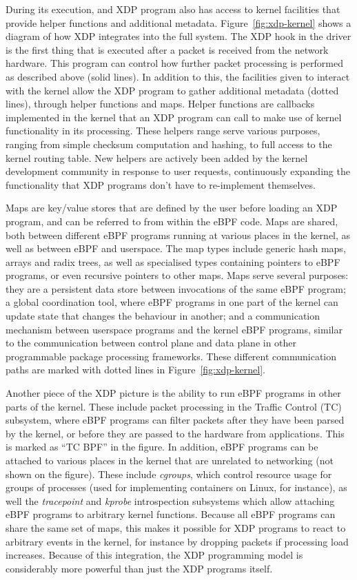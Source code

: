 \documentclass[10pt,sigconf]{acmart}
\begin{document}
During its execution, and XDP program also has access to kernel facilities that
provide helper functions and additional metadata. Figure~\ref{fig:xdp-kernel}
shows a diagram of how XDP integrates into the full system. The XDP hook in the
driver is the first thing that is executed after a packet is received from the
network hardware. This program can control how further packet processing is
performed as described above (solid lines). In addition to this, the facilities
given to interact with the kernel allow the XDP program to gather additional
metadata (dotted lines), through helper functions and maps. Helper functions are
callbacks implemented in the kernel that an XDP program can call to make use of
kernel functionality in its processing. These helpers range serve various
purposes, ranging from simple checksum computation and hashing, to full access
to the kernel routing table. New helpers are actively been added by the kernel
development community in response to user requests, continuously expanding the
functionality that XDP programs don't have to re-implement themselves.

Maps are key/value stores that are defined by the user before loading an XDP
program, and can be referred to from within the eBPF code. Maps are shared, both
between different eBPF programs running at various places in the kernel, as well
as between eBPF and userspace. The map types include generic hash maps, arrays
and radix trees, as well as specialised types containing pointers to eBPF
programs, or even recursive pointers to other maps. Maps serve several purposes:
they are a persistent data store between invocations of the same eBPF program; a
global coordination tool, where eBPF programs in one part of the kernel can
update state that changes the behaviour in another; and a communication
mechanism between userspace programs and the kernel eBPF programs, similar to
the communication between control plane and data plane in other programmable
package processing frameworks. These different communication paths are marked
with dotted lines in Figure~\ref{fig:xdp-kernel}.

Another piece of the XDP picture is the ability to run eBPF programs in other
parts of the kernel. These include packet processing in the Traffic Control (TC)
subsystem, where eBPF programs can filter packets after they have been parsed by
the kernel, or before they are passed to the hardware from applications. This is
marked as ``TC BPF'' in the figure. In addition, eBPF programs can be attached
to various places in the kernel that are unrelated to networking (not shown on
the figure). These include \emph{cgroups}, which control resource usage for
groups of processes (used for implementing containers on Linux, for instance),
as well the \emph{tracepoint} and \emph{kprobe} introspection subsystems which
allow attaching eBPF programs to arbitrary kernel functions. Because all eBPF
programs can share the same set of maps, this makes it possible for XDP programs
to react to arbitrary events in the kernel, for instance by dropping packets if
processing load increases. Because of this integration, the XDP programming
model is considerably more powerful than just the XDP programs itself.
\end{document}
